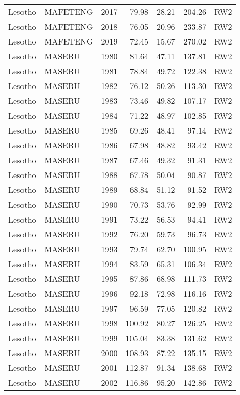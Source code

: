 \begin{longtable}{lllrrrl}
  Lesotho & MAFETENG & 2017 & 79.98 & 28.21 & 204.26 & RW2 \\ 
  Lesotho & MAFETENG & 2018 & 76.05 & 20.96 & 233.87 & RW2 \\ 
  Lesotho & MAFETENG & 2019 & 72.45 & 15.67 & 270.02 & RW2 \\ 
  Lesotho & MASERU & 1980 & 81.64 & 47.11 & 137.81 & RW2 \\ 
  Lesotho & MASERU & 1981 & 78.84 & 49.72 & 122.38 & RW2 \\ 
  Lesotho & MASERU & 1982 & 76.12 & 50.26 & 113.30 & RW2 \\ 
  Lesotho & MASERU & 1983 & 73.46 & 49.82 & 107.17 & RW2 \\ 
  Lesotho & MASERU & 1984 & 71.22 & 48.97 & 102.85 & RW2 \\ 
  Lesotho & MASERU & 1985 & 69.26 & 48.41 & 97.14 & RW2 \\ 
  Lesotho & MASERU & 1986 & 67.98 & 48.82 & 93.42 & RW2 \\ 
  Lesotho & MASERU & 1987 & 67.46 & 49.32 & 91.31 & RW2 \\ 
  Lesotho & MASERU & 1988 & 67.78 & 50.04 & 90.87 & RW2 \\ 
  Lesotho & MASERU & 1989 & 68.84 & 51.12 & 91.52 & RW2 \\ 
  Lesotho & MASERU & 1990 & 70.73 & 53.76 & 92.99 & RW2 \\ 
  Lesotho & MASERU & 1991 & 73.22 & 56.53 & 94.41 & RW2 \\ 
  Lesotho & MASERU & 1992 & 76.20 & 59.73 & 96.73 & RW2 \\ 
  Lesotho & MASERU & 1993 & 79.74 & 62.70 & 100.95 & RW2 \\ 
  Lesotho & MASERU & 1994 & 83.59 & 65.31 & 106.34 & RW2 \\ 
  Lesotho & MASERU & 1995 & 87.86 & 68.98 & 111.73 & RW2 \\ 
  Lesotho & MASERU & 1996 & 92.18 & 72.98 & 116.16 & RW2 \\ 
  Lesotho & MASERU & 1997 & 96.59 & 77.05 & 120.82 & RW2 \\ 
  Lesotho & MASERU & 1998 & 100.92 & 80.27 & 126.25 & RW2 \\ 
  Lesotho & MASERU & 1999 & 105.04 & 83.38 & 131.62 & RW2 \\ 
  Lesotho & MASERU & 2000 & 108.93 & 87.22 & 135.15 & RW2 \\ 
  Lesotho & MASERU & 2001 & 112.87 & 91.34 & 138.68 & RW2 \\ 
  Lesotho & MASERU & 2002 & 116.86 & 95.20 & 142.86 & RW2 \\ 

\end{longtable}
